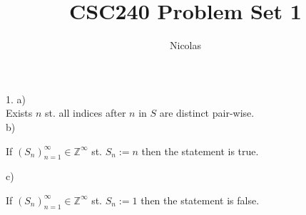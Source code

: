 \documentclass[11pt]{article}
\title{CSC240 Problem Set 1}
\author{Nicolas}
\newcommand{\Z}{\mathbb{Z}}
\begin{document}
\maketitle
\begin{flushleft}

1. a) \\
\bigskip
Exists $n$ st. all indices after $n$ in $S$ are distinct pair-wise. \\
\bigskip
b) \\
\bigskip

If $(S_n)_{n=1}^\infty \in \Z^\infty$ st. $S_n := n$ then the statement is true.

c) \\
\bigskip

If $(S_n)_{n=1}^\infty \in \Z^\infty$ st. $S_n := 1$ then the statement is false.
\\
\bigskip


\end{flushleft}
\end{document}
